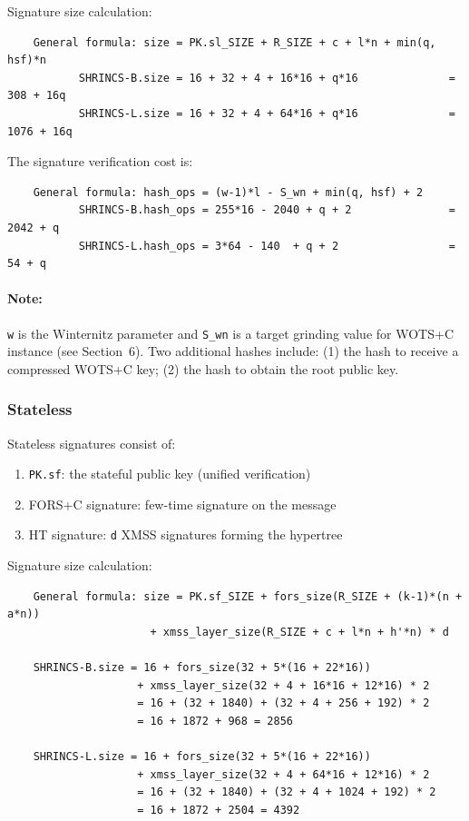Signature size calculation: 
\begin{verbatim}
    General formula: size = PK.sl_SIZE + R_SIZE + c + l*n + min(q, hsf)*n 
           SHRINCS-B.size = 16 + 32 + 4 + 16*16 + q*16              = 308 + 16q
           SHRINCS-L.size = 16 + 32 + 4 + 64*16 + q*16              = 1076 + 16q
\end{verbatim}

The signature verification cost is:
\begin{verbatim}
    General formula: hash_ops = (w-1)*l - S_wn + min(q, hsf) + 2 
           SHRINCS-B.hash_ops = 255*16 - 2040 + q + 2               = 2042 + q
           SHRINCS-L.hash_ops = 3*64 - 140  + q + 2                 = 54 + q
\end{verbatim}

\paragraph{Note:} \texttt{w} is the Winternitz parameter and \texttt{S\_wn} is a target grinding value for WOTS+C instance (see Section~6). Two additional hashes include: (1) the hash to receive a compressed WOTS+C key; (2) the hash to obtain the root public key.

\subsubsection{Stateless}
Stateless signatures consist of:
\begin{enumerate}
    \item \texttt{PK.sf}: the stateful public key (unified verification)
    \item FORS+C signature: few-time signature on the message
    \item HT signature: \texttt{d} XMSS signatures forming the hypertree
\end{enumerate}

Signature size calculation: 
\begin{verbatim}
    General formula: size = PK.sf_SIZE + fors_size(R_SIZE + (k-1)*(n + a*n))
                      + xmss_layer_size(R_SIZE + c + l*n + h'*n) * d

    SHRINCS-B.size = 16 + fors_size(32 + 5*(16 + 22*16))
                    + xmss_layer_size(32 + 4 + 16*16 + 12*16) * 2
                    = 16 + (32 + 1840) + (32 + 4 + 256 + 192) * 2
                    = 16 + 1872 + 968 = 2856

    SHRINCS-L.size = 16 + fors_size(32 + 5*(16 + 22*16))
                    + xmss_layer_size(32 + 4 + 64*16 + 12*16) * 2
                    = 16 + (32 + 1840) + (32 + 4 + 1024 + 192) * 2
                    = 16 + 1872 + 2504 = 4392
\end{verbatim}

